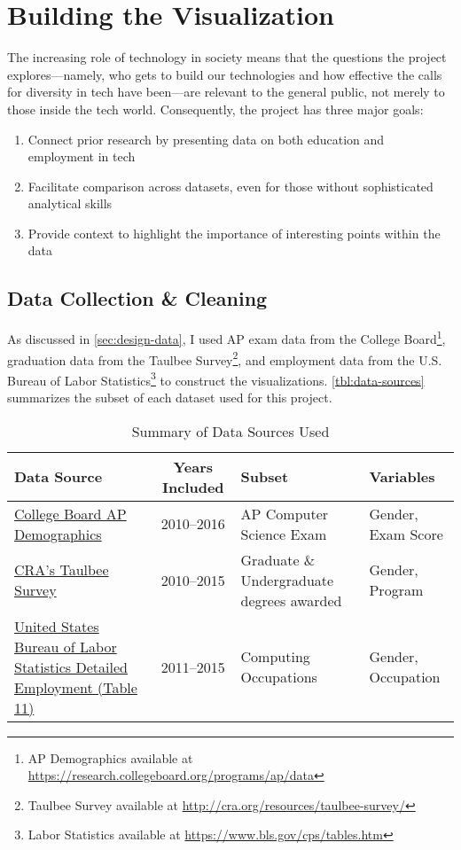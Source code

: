 \section{Building the Visualization}\label{sec:methodology}
{\color{Magenta}
The increasing role of technology in society means that the questions the project explores---namely, who gets to build our technologies and how effective the calls for diversity in tech have been---are relevant to the general public, not merely to those inside the tech world. Consequently, the project has three major goals:
\begin{enumerate}
  \item Connect prior research by presenting data on both education and employment in tech
  \item Facilitate comparison across datasets, even for those without sophisticated analytical skills
  \item Provide context to highlight the importance of interesting points within the data
\end{enumerate}
}

\subsection{Data Collection \& Cleaning}\label{sec:dev-data}
As discussed in \autoref{sec:design-data}, I used AP exam data from the College Board\footnote{AP Demographics available at \url{https://research.collegeboard.org/programs/ap/data}}, graduation data from the Taulbee Survey\footnote{Taulbee Survey available at \url{http://cra.org/resources/taulbee-survey/}}, and employment data from the U.S. Bureau of Labor Statistics\footnote{Labor Statistics available at \url{https://www.bls.gov/cps/tables.htm}}
 to construct the visualizations. \autoref{tbl:data-sources} summarizes the subset of each dataset used for this project.

\begin{table}
  \begin{tabular}{L{3.6cm}cL{4cm}l} \hline
    \textbf{Data Source} & \textbf{Years Included} & \textbf{Subset} & \textbf{Variables} \\ \hline
    \href{https://research.collegeboard.org/programs/ap/data}{College Board AP Demographics}
      & 2010--2016
      & AP Computer Science Exam
      & Gender, Exam Score \\
    \href{http://cra.org/resources/taulbee-survey/}{CRA's Taulbee Survey}
      & 2010--2015
      & Graduate \& Undergraduate degrees awarded
      & Gender, Program \\
    \href{https://www.bls.gov/cps/tables.htm}{United States Bureau of Labor Statistics Detailed Employment (Table 11)}
      & 2011--2015
      & Computing Occupations
      & Gender, Occupation \\ \hline
  \end{tabular}
  \caption{Summary of Data Sources Used}\label{tbl:data-sources}
\end{table}

